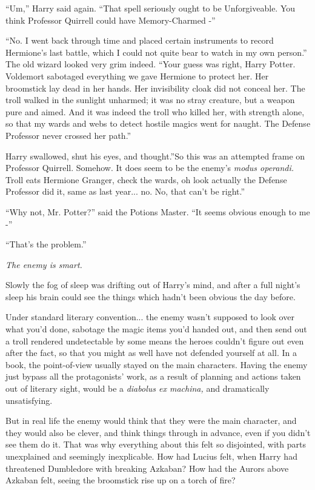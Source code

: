 ``Um,'' Harry said again. ``That spell seriously ought to be
Unforgiveable. You think Professor Quirrell could have Memory-Charmed
-''

``No. I went back through time and placed certain instruments to record
Hermione's last battle, which I could not quite bear to watch in my own
person.'' The old wizard looked very grim indeed. ``Your guess was
right, Harry Potter. Voldemort sabotaged everything we gave Hermione to
protect her. Her broomstick lay dead in her hands. Her invisibility
cloak did not conceal her. The troll walked in the sunlight unharmed; it
was no stray creature, but a weapon pure and aimed. And it was indeed
the troll who killed her, with strength alone, so that my wards and webs
to detect hostile magics went for naught. The Defense Professor never
crossed her path.''

Harry swallowed, shut his eyes, and thought.''So this was an attempted
frame on Professor Quirrell. Somehow. It does seem to be the enemy's
\emph{modus operandi.} Troll eats Hermione Granger, check the wards, oh
look actually the Defense Professor did it, same as last year...
no. No, that can't be right.''

``Why not, Mr. Potter?'' said the Potions Master. ``It seems obvious
enough to me -''

``That's the problem.''

\emph{The enemy is smart.}

Slowly the fog of sleep was drifting out of Harry's mind, and after a
full night's sleep his brain could see the things which hadn't been
obvious the day before.

Under standard literary convention... the enemy wasn't supposed to
look over what you'd done, sabotage the magic items you'd handed out,
and then send out a troll rendered undetectable by some means the heroes
couldn't figure out even after the fact, so that you might as well have
not defended yourself at all. In a book, the point-of-view usually
stayed on the main characters. Having the enemy just bypass all the
protagonists' work, as a result of planning and actions taken out of
literary sight, would be a \emph{diabolus ex machina,} and dramatically
unsatisfying.

But in real life the enemy would think that they were the main
character, and they would also be clever, and think things through in
advance, even if you didn't see them do it. That was why everything
about this felt so disjointed, with parts unexplained and seemingly
inexplicable. How had Lucius felt, when Harry had threatened Dumbledore
with breaking Azkaban? How had the Aurors above Azkaban felt, seeing the
broomstick rise up on a torch of fire?

